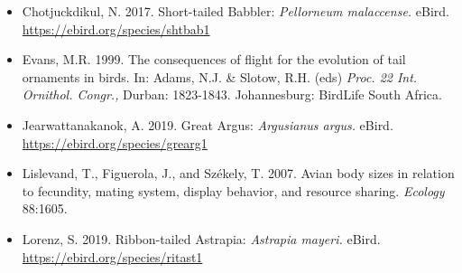 \documentclass[
  12pt,
]{article}
\begin{document}
\begin{itemize}
\item
  Chotjuckdikul, N. 2017. Short-tailed Babbler: \emph{Pellorneum
  malaccense.} eBird. \url{https://ebird.org/species/shtbab1}
\item
  Evans, M.R. 1999. The consequences of flight for the evolution of tail
  ornaments in birds. In: Adams, N.J. \& Slotow, R.H. (eds) \emph{Proc.
  22 Int. Ornithol. Congr.,} Durban: 1823-1843. Johannesburg: BirdLife
  South Africa.
\item
  Jearwattanakanok, A. 2019. Great Argus: \emph{Argusianus argus.}
  eBird. \url{https://ebird.org/species/grearg1}
\item
  Lislevand, T., Figuerola, J., and Székely, T. 2007. Avian body sizes
  in relation to fecundity, mating system, display behavior, and
  resource sharing. \emph{Ecology} 88:1605.
\item
  Lorenz, S. 2019. Ribbon-tailed Astrapia: \emph{Astrapia mayeri.}
  eBird. \url{https://ebird.org/species/ritast1}
\end{itemize}
\end{document}
